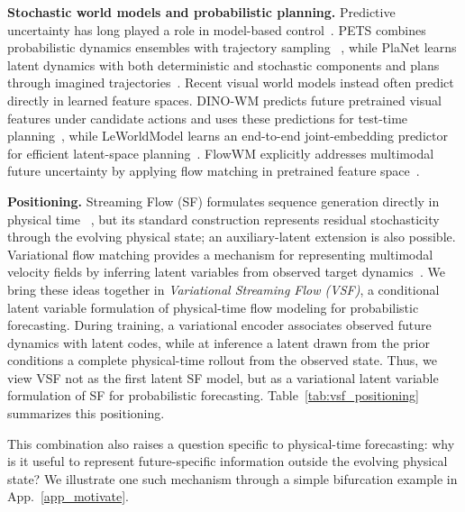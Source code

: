 \textbf{Stochastic world models and probabilistic planning.} Predictive uncertainty has long played a role in model-based control~\citep{watter2015embed,ha2018world,hafner2025mastering}. PETS combines probabilistic dynamics ensembles with trajectory sampling
~\citep{chua2018deep}, while PlaNet learns latent dynamics with both
deterministic and stochastic components and plans through imagined
trajectories~\citep{hafner2019planet}. Recent visual world models instead often predict directly in learned feature spaces. DINO-WM predicts future pretrained visual features under candidate actions and uses these predictions for test-time planning~\citep{zhou2025dinowm}, while LeWorldModel learns an end-to-end joint-embedding predictor for efficient latent-space planning~\citep{maes2026leworldmodel}. FlowWM explicitly addresses multimodal future uncertainty by applying flow matching in pretrained feature space~\citep{porcher2026flow}. 



{\bf Positioning.}  Streaming Flow (SF) formulates sequence generation directly in physical time
~\citep{jiang2025streaming}, but its standard construction represents residual
stochasticity through the evolving physical state; an auxiliary-latent
extension is also possible. Variational flow matching provides a mechanism for
representing multimodal velocity fields by inferring latent variables from
observed target dynamics~\citep{guo2025variational,eijkelboom2024variational}.
We bring these ideas together in \emph{Variational Streaming Flow (VSF)}, a
conditional latent variable formulation of physical-time flow modeling for
probabilistic forecasting. During training, a variational encoder associates
observed future dynamics with latent codes, while at inference a latent drawn
from the prior conditions a complete physical-time rollout from the observed
state. Thus, we view VSF not as the first latent SF model, but as a variational
latent variable formulation of SF for probabilistic forecasting.
Table~\ref{tab:vsf_positioning} summarizes this positioning.

This combination also raises a question specific to physical-time forecasting:
why is it useful to represent future-specific information outside the evolving
physical state? We illustrate one such mechanism through a simple
bifurcation example in App.~\ref{app_motivate}.


